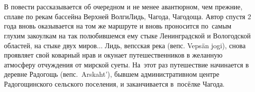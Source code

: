 \chapter*{}

В повести рассказывается об очередном и не менее авантюрном, чем прежние, сплаве по рекам бассейна Верхней Волги\mdash Лидь, Чагода, Чагодоща. Автор спустя 2 года вновь оказывается на том же маршруте и вновь проносится по~самым глухим закоулкам на так полюбившемся ему стыке Ленинградской и Вологодской областей, на стыке двух миров$\ldots$ Лидь, вепсская река (вепс. Veps{\"a}n jogi), снова проявляет свой коварный нрав и окунает путешественников в желанную атмосферу отчуждения от мирской суеты. На~этот раз путешествие начинается в деревне Радогощь (вепс.~Arskaht'), бывшем административном центре Радогощинского сельского поселения, и заканчивается в~посёлке Чагода. 
%
